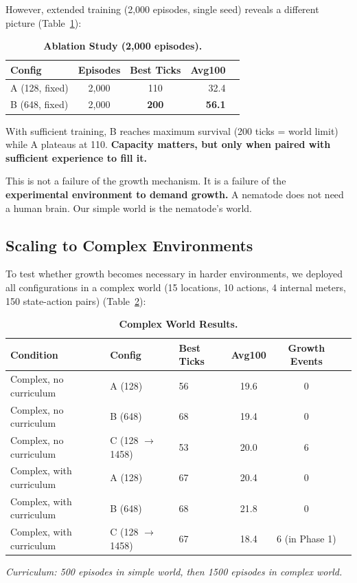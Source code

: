 \documentclass{article}
\begin{document}
However, extended training (2,000 episodes, single seed) reveals a different picture (Table~\ref{tab:ablation_2000}):

\begin{table}[h]
\centering
\caption{\textbf{Ablation Study (2,000 episodes).}}
\label{tab:ablation_2000}
\begin{tabular}{lccrr}
\toprule
\textbf{Config} & \textbf{Episodes} & \textbf{Best Ticks} & \textbf{Avg100} \\
\midrule
A (128, fixed) & 2,000 & 110 & 32.4 \\
B (648, fixed) & 2,000 & \textbf{200} & \textbf{56.1} \\
\bottomrule
\end{tabular}
\end{table}

With sufficient training, B reaches maximum survival (200 ticks = world limit) while A plateaus at 110. \textbf{Capacity matters, but only when paired with sufficient experience to fill it.}

This is not a failure of the growth mechanism. It is a failure of the \textbf{experimental environment to demand growth.} A nematode does not need a human brain. Our simple world is the nematode's world.

\subsection{Scaling to Complex Environments}
To test whether growth becomes necessary in harder environments, we deployed all configurations in a complex world (15 locations, 10 actions, 4 internal meters, 150 state-action pairs) (Table~\ref{tab:complex_world}):

\begin{table}[h]
\centering
\caption{\textbf{Complex World Results.}}
\label{tab:complex_world}
\begin{tabular}{lllccr}
\toprule
\textbf{Condition} & \textbf{Config} & \textbf{Best Ticks} & \textbf{Avg100} & \textbf{Growth Events} \\
\midrule
Complex, no curriculum & A (128) & 56 & 19.6 & 0 \\
Complex, no curriculum & B (648) & 68 & 19.4 & 0 \\
Complex, no curriculum & C (128 $\rightarrow$ 1458) & 53 & 20.0 & 6 \\
Complex, with curriculum & A (128) & 67 & 20.4 & 0 \\
Complex, with curriculum & B (648) & 68 & 21.8 & 0 \\
Complex, with curriculum & C (128 $\rightarrow$ 1458) & 67 & 18.4 & 6 (in Phase 1) \\
\bottomrule
\end{tabular}
\end{table}
\textit{Curriculum: 500 episodes in simple world, then 1500 episodes in complex world.}
\end{document}
